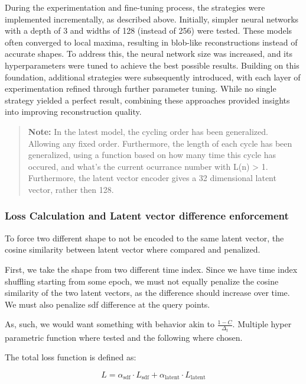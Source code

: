 \documentclass[a4paper,12pt]{article}
\begin{document}
During the experimentation and fine-tuning process, the strategies were implemented incrementally, as described above. Initially, simpler neural networks with a depth of 3 and widths of 128 (instead of 256) were tested. These models often converged to local maxima, resulting in blob-like reconstructions instead of accurate shapes. To address this, the neural network size was increased, and its hyperparameters were tuned to achieve the best possible results. Building on this foundation, additional strategies were subsequently introduced, with each layer of experimentation refined through further parameter tuning. While no single strategy yielded a perfect result, combining these approaches provided insights into improving reconstruction quality.

\begin{quote}
	\textbf{Note:} In the latest model, the cycling order has been generalized. Allowing any fixed order. Furthermore, the length of each cycle has been
	generalized, using a function based on how many time this cycle has occured, and what's the current ocurrance number with L(n) > 1.
	Furthermore, the latent vector encoder gives a 32 dimensional latent vector, rather then 128.
\end{quote}

\subsubsection*{Loss Calculation and Latent vector difference enforcement}
To force two different shape to not be encoded to the same latent vector, the cosine similarity between latent vector where compared and penalized.

First, we take the shape from two different time index. Since we have time index shuffling starting from some epoch, we must not equally penalize
the cosine similarity of the two latent vectors, as the difference should increase over time. We must also penalize sdf difference at the query points.

As, such, we would want something with behavior akin to $\frac{1 - C}{\Delta_t}$. Multiple hyper parametric function where tested and the following
where chosen.

The total loss function is defined as:

\begin{equation}
	L = \alpha_{\text{sdf}} \cdot L_{\text{sdf}} + \alpha_{\text{latent}} \cdot L_{\text{latent}}
\end{equation}
\end{document}
